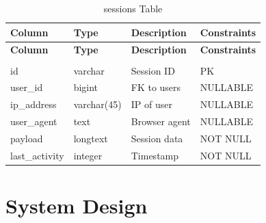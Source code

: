 \renewcommand{\arraystretch}{1.3}
\begin{longtable}{|p{3cm}|p{3cm}|p{4cm}|p{3cm}|}
    \hline
    \textbf{Column} & \textbf{Type} & \textbf{Description} & \textbf{Constraints} \\
    \hline
    \endfirsthead
    \hline
    \textbf{Column} & \textbf{Type} & \textbf{Description} & \textbf{Constraints} \\
    \hline
    \endhead
    \hline
    \endfoot
    \hline
    \caption{sessions Table} \label{tab:sessions} \\
    \endlastfoot
    id & varchar & Session ID & PK \\
    \hline
    user\_id & bigint & FK to users & NULLABLE \\
    \hline
    ip\_address & varchar(45) & IP of user & NULLABLE \\
    \hline
    user\_agent & text & Browser agent & NULLABLE \\
    \hline
    payload & longtext & Session data & NOT NULL \\
    \hline
    last\_activity & integer & Timestamp & NOT NULL \\
    \hline
\end{longtable}

\section{System Design}

